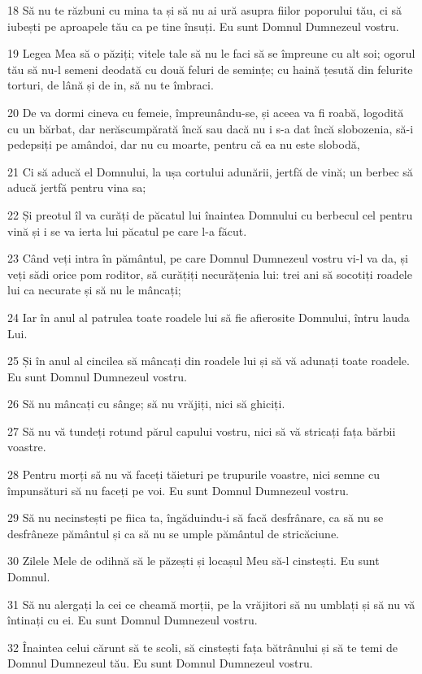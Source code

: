 \par 18 Să nu te răzbuni cu mina ta și să nu ai ură asupra fiilor poporului tău, ci să iubești pe aproapele tău ca pe tine însuți. Eu sunt Domnul Dumnezeul vostru.
\par 19 Legea Mea să o păziți; vitele tale să nu le faci să se împreune cu alt soi; ogorul tău să nu-l semeni deodată cu două feluri de semințe; cu haină țesută din felurite torturi, de lână și de in, să nu te îmbraci.
\par 20 De va dormi cineva cu femeie, împreunându-se, și aceea va fi roabă, logodită cu un bărbat, dar nerăscumpărată încă sau dacă nu i s-a dat încă slobozenia, să-i pedepsiți pe amândoi, dar nu cu moarte, pentru că ea nu este slobodă,
\par 21 Ci să aducă el Domnului, la ușa cortului adunării, jertfă de vină; un berbec să aducă jertfă pentru vina sa;
\par 22 Și preotul îl va curăți de păcatul lui înaintea Domnului cu berbecul cel pentru vină și i se va ierta lui păcatul pe care l-a făcut.
\par 23 Când veți intra în pământul, pe care Domnul Dumnezeul vostru vi-l va da, și veți sădi orice pom roditor, să curățiți necurățenia lui: trei ani să socotiți roadele lui ca necurate și să nu le mâncați;
\par 24 Iar în anul al patrulea toate roadele lui să fie afierosite Domnului, întru lauda Lui.
\par 25 Și în anul al cincilea să mâncați din roadele lui și să vă adunați toate roadele. Eu sunt Domnul Dumnezeul vostru.
\par 26 Să nu mâncați cu sânge; să nu vrăjiți, nici să ghiciți.
\par 27 Să nu vă tundeți rotund părul capului vostru, nici să vă stricați fața bărbii voastre.
\par 28 Pentru morți să nu vă faceți tăieturi pe trupurile voastre, nici semne cu împunsături să nu faceți pe voi. Eu sunt Domnul Dumnezeul vostru.
\par 29 Să nu necinstești pe fiica ta, îngăduindu-i să facă desfrânare, ca să nu se desfrâneze pământul și ca să nu se umple pământul de stricăciune.
\par 30 Zilele Mele de odihnă să le păzești și locașul Meu să-l cinstești. Eu sunt Domnul.
\par 31 Să nu alergați la cei ce cheamă morții, pe la vrăjitori să nu umblați și să nu vă întinați cu ei. Eu sunt Domnul Dumnezeul vostru.
\par 32 Înaintea celui cărunt să te scoli, să cinstești fața bătrânului și să te temi de Domnul Dumnezeul tău. Eu sunt Domnul Dumnezeul vostru.
